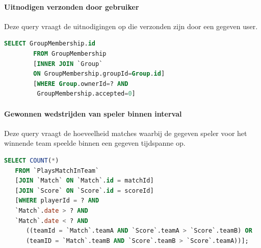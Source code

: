 \documentclass[11pt]{article}
\begin{document}
\paragraph{Uitnodigen verzonden door gebruiker}

  Deze query vraagt de uitnodigingen op die verzonden zijn door een gegeven user.

  \begin{framed}
  \begin{lstlisting}[language=sql]
    SELECT GroupMembership.id
		FROM GroupMembership
		[INNER JOIN `Group`
		ON GroupMembership.groupId=Group.id]
		[WHERE Group.ownerId=? AND
		 GroupMembership.accepted=0]
  \end{lstlisting}
  \end{framed}


\paragraph{Gewonnen wedstrijden van speler binnen interval}

  Deze query vraagt de hoeveelheid matches waarbij de gegeven speler voor het winnende team speelde binnen een gegeven tijdspanne op.

  \begin{framed}
  \begin{lstlisting}[language=sql]
  SELECT COUNT(*)
   FROM `PlaysMatchInTeam`
   [JOIN `Match` ON `Match`.id = matchId]
   [JOIN `Score` ON `Score`.id = scoreId]
   [WHERE playerId = ? AND
   `Match`.date > ? AND
   `Match`.date < ? AND
      ((teamId = `Match`.teamA AND `Score`.teamA > `Score`.teamB) OR
      (teamID = `Match`.teamB AND `Score`.teamB > `Score`.teamA))];
  \end{lstlisting}
  \end{framed}
\end{document}
